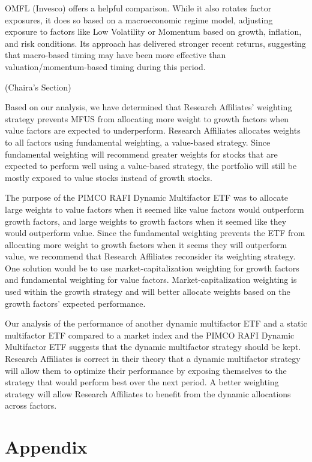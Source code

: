 \documentclass[
  letterpaper,
  DIV=11,
  numbers=noendperiod]{scrartcl}
\begin{document}
OMFL (Invesco) offers a helpful comparison. While it also rotates factor
exposures, it does so based on a macroeconomic regime model, adjusting
exposure to factors like Low Volatility or Momentum based on growth,
inflation, and risk conditions. Its approach has delivered stronger
recent returns, suggesting that macro-based timing may have been more
effective than valuation/momentum-based timing during this period.

(Chaira's Section)

Based on our analysis, we have determined that Research Affiliates'
weighting strategy prevents MFUS from allocating more weight to growth
factors when value factors are expected to underperform. Research
Affiliates allocates weights to all factors using fundamental weighting,
a value-based strategy. Since fundamental weighting will recommend
greater weights for stocks that are expected to perform well using a
value-based strategy, the portfolio will still be mostly exposed to
value stocks instead of growth stocks.

The purpose of the PIMCO RAFI Dynamic Multifactor ETF was to allocate
large weights to value factors when it seemed like value factors would
outperform growth factors, and large weights to growth factors when it
seemed like they would outperform value. Since the fundamental weighting
prevents the ETF from allocating more weight to growth factors when it
seems they will outperform value, we recommend that Research Affiliates
reconsider its weighting strategy. One solution would be to use
market-capitalization weighting for growth factors and fundamental
weighting for value factors. Market-capitalization weighting is used
within the growth strategy and will better allocate weights based on the
growth factors' expected performance.

Our analysis of the performance of another dynamic multifactor ETF and a
static multifactor ETF compared to a market index and the PIMCO RAFI
Dynamic Multifactor ETF suggests that the dynamic multifactor strategy
should be kept. Research Affiliates is correct in their theory that a
dynamic multifactor strategy will allow them to optimize their
performance by exposing themselves to the strategy that would perform
best over the next period. A better weighting strategy will allow
Research Affiliates to benefit from the dynamic allocations across
factors.

\section{Appendix}\label{appendix}
\end{document}
